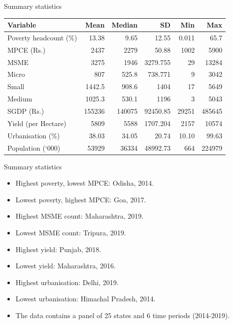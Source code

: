 \documentclass[10pt,aspectratio=169]{beamer}
\begin{document}
\begin{frame}{Summary statistics}
    \begin{table}[htbp]
    \small
    \centering
       \begin{tabular}{l*{5}{r}}
    \toprule
     Variable   &  Mean & Median & SD & Min & Max\\
     \midrule
      Poverty headcount (\%) & 13.38 & 9.65 & 12.55 & 0.011 & 65.7\\
      MPCE (Rs.) & 2437 & 2279 & 50.88 & 1002 & 5900 \\
      MSME & 3275 & 1946 & 3279.755 & 29 & 13284 \\
      Micro  & 807 & 525.8 & 738.771 & 9 & 3042 \\
      Small  & 1442.5 & 908.6  & 1404&  17  & 5649  \\
      Medium  & 1025.3 & 530.1 & 1196 & 3 & 5043  \\
      SGDP (Rs.) & 155236 & 140075 & 92450.85 & 29251 & 485645 \\
      Yield (per Hectare) & 5809 & 5588 & 1707.204 & 2157 & 10574 \\
      Urbanisation (\%) & 38.03 & 34.05 & 20.74 & 10.10 & 99.63 \\
      Population (`000) & 53929 & 36334 & 48992.73 & 664 & 224979 \\
      \bottomrule
    \end{tabular}
    \label{tab:sumstats}
\end{table} 

\end{frame}

\begin{frame}{Summary statistics}

\begin{itemize}
    \item Highest poverty, lowest MPCE: Odisha, 2014.
    \item Lowest poverty, highest MPCE: Goa, 2017.
    \item Highest MSME count: Maharashtra, 2019.
    \item Lowest MSME count: Tripura, 2019.
    \item Highest yield: Punjab, 2018.
    \item Lowest yield: Maharashtra, 2016.
    \item Highest urbanisation: Delhi, 2019.
    \item Lowest urbanisation: Himachal Pradesh, 2014.
    \item  The data contains a panel of 25 states and 6 time periods (2014-2019).
\end{itemize}
\end{frame}
\end{document}
